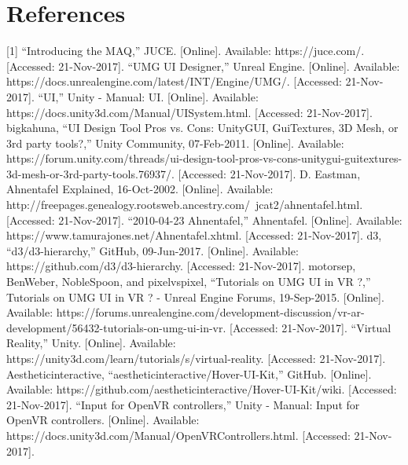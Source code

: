 \documentclass[onecolumn, draftclsnofoot,10pt, compsoc]{IEEEtran}
\begin{document}
\section{References}
[1] “Introducing the MAQ,” JUCE. [Online]. Available: https://juce.com/. [Accessed: 21-Nov-2017]. 
\newline
[2] “UMG UI Designer,” Unreal Engine. [Online]. Available: https://docs.unrealengine.com/latest/INT/Engine/UMG/. [Accessed: 21-Nov-2017]. 
\newline
[3] “UI,” Unity - Manual: UI. [Online]. Available: https://docs.unity3d.com/Manual/UISystem.html. [Accessed: 21-Nov-2017].
\newline
[4] bigkahuna, “UI Design Tool Pros vs. Cons: UnityGUI, GuiTextures, 3D Mesh, or 3rd party tools?,” Unity Community, 07-Feb-2011. [Online]. Available: https://forum.unity.com/threads/ui-design-tool-pros-vs-cons-unitygui-guitextures-3d-mesh-or-3rd-party-tools.76937/. [Accessed: 21-Nov-2017].
\newline
[5] D. Eastman, Ahnentafel Explained, 16-Oct-2002. [Online]. Available: http://freepages.genealogy.rootsweb.ancestry.com/~jcat2/ahnentafel.html. [Accessed: 21-Nov-2017].
\newline
[6] “2010-04-23 Ahnentafel,” Ahnentafel. [Online]. Available: https://www.tamurajones.net/Ahnentafel.xhtml. [Accessed: 21-Nov-2017].
\newline
[7] d3, “d3/d3-hierarchy,” GitHub, 09-Jun-2017. [Online]. Available: https://github.com/d3/d3-hierarchy. [Accessed: 21-Nov-2017].
\newline
[8] motorsep, BenWeber, NobleSpoon, and pixelvspixel, “Tutorials on UMG UI in VR ?,” Tutorials on UMG UI in VR ? - Unreal Engine Forums, 19-Sep-2015. [Online]. Available: https://forums.unrealengine.com/development-discussion/vr-ar-development/56432-tutorials-on-umg-ui-in-vr. [Accessed: 21-Nov-2017].
\newline
[9] “Virtual Reality,” Unity. [Online]. Available: https://unity3d.com/learn/tutorials/s/virtual-reality. [Accessed: 21-Nov-2017].
\newline
[10] Aestheticinteractive, “aestheticinteractive/Hover-UI-Kit,” GitHub. [Online]. Available: https://github.com/aestheticinteractive/Hover-UI-Kit/wiki. [Accessed: 21-Nov-2017].
\newline
[11] “Input for OpenVR controllers,” Unity - Manual: Input for OpenVR controllers. [Online]. Available: https://docs.unity3d.com/Manual/OpenVRControllers.html. [Accessed: 21-Nov-2017]. 
\end{document}
